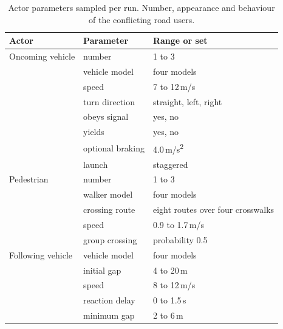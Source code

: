 \begin{table}[htbp]
    \centering
    \caption[Actor parameters sampled per run]{Actor parameters sampled per run. Number, appearance and behaviour of the conflicting road users.}
    \label{tab:actor_parameters}
    \small
    \begin{tabular}{@{}lll@{}}
        \toprule
        {\bfseries Actor} & {\bfseries Parameter} & {\bfseries Range or set} \\
        \midrule
        Oncoming vehicle & number            & 1 to 3 \\
                         & vehicle model     & four models \\
                         & speed             & 7 to 12\,m/s \\
                         & turn direction    & straight, left, right \\
                         & obeys signal      & yes, no \\
                         & yields            & yes, no \\
                         & optional braking  & 4.0\,m/s\textsuperscript{2} \\
                         & launch            & staggered \\
        \midrule
        Pedestrian       & number            & 1 to 3 \\
                         & walker model      & four models \\
                         & crossing route    & eight routes over four crosswalks \\
                         & speed             & 0.9 to 1.7\,m/s \\
                         & group crossing    & probability 0.5 \\
        \midrule
        Following vehicle & vehicle model    & four models \\
                         & initial gap       & 4 to 20\,m \\
                         & speed             & 8 to 12\,m/s \\
                         & reaction delay    & 0 to 1.5\,s \\
                         & minimum gap       & 2 to 6\,m \\
        \bottomrule
    \end{tabular}
\end{table}

